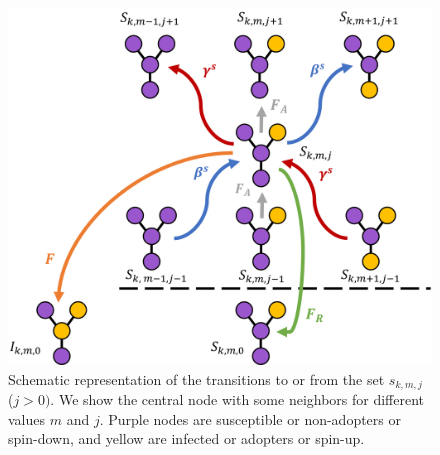 \begin{figure}
    \vspace{0.5 cm}
    \includegraphics[width=\columnwidth]{Figs/Appendix2_Threshold/AME_PLOT.png}
    \caption{\label{fig:ame_plot1} Schematic representation of the transitions to or from the set $s_{k,m,j}$ ($j > 0)$. We show the central node with some neighbors for different values $m$ and $j$. Purple nodes are susceptible or non-adopters or spin-down, and yellow are infected or adopters or spin-up.}
    \end{figure}
    

